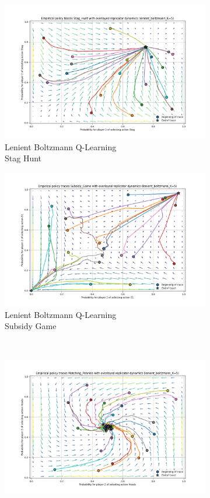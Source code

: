 \documentclass[12pt,letterpaper, onecolumn]{exam}
\begin{document}
\begin{figure}[H]
    \begin{subfigure}{.5\textwidth}
      \centering
      \includegraphics[width=.6\linewidth]{plots/replicator_trajectoreis_Stag_Hunt_lenient_boltzmann_K=5.png}
      \caption{Lenient Boltzmann Q-Learning\\ Stag Hunt}
      \label{fig:sfiglbsh}
    \end{subfigure}%
    \begin{subfigure}{.5\textwidth}
      \centering
      \includegraphics[width=.6\linewidth]{plots/replicator_trajectoreis_Subsidy_Game_lenient_boltzmann_K=5.png}
      \caption{Lenient Boltzmann Q-Learning\\ Subsidy Game}
      \label{fig:sfiglbsg}
    \end{subfigure}\\
    \begin{subfigure}{.5\textwidth}
      \centering
      \includegraphics[width=.6\linewidth]{plots/replicator_trajectoreis_Matching_Pennies_lenient_boltzmann_K=5.png}

\end{subfigure}
\end{figure}
\end{document}
